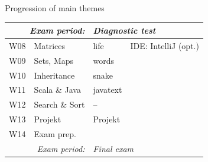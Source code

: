 \documentclass[aspectratio=169]{beamer}
\newenvironment{Slide}[1]%
  {\begin{frame}[environment=Slide]{#1}}
  {\end{frame}}%
\begin{document}
\begin{Slide}{Progression of main themes}
\begin{minipage}{0.54\textwidth}
\begin{tabular}{|l|l|l|l|}
      \multicolumn{2}{r}{\textit{Exam period:}} & \multicolumn{2}{l}{\textit{Diagnostic test}} \\ \hline
      W08 & Matrices        & life        & IDE: IntelliJ (opt.)\\
      W09 & Sets, Maps      & words       & \\
      W10 & Inheritance     & snake       & \\
      W11 & Scala \& Java   & javatext    & \\
      W12 & Search \& Sort  & --          & \\
      W13 & Projekt         & Projekt     & \\
      W14 & Exam prep.      &             & \\ \hline
      \multicolumn{2}{r}{\textit{Exam period:}} & \multicolumn{2}{l}{\textit{Final exam}} \\ \hline
      \end{tabular}  


\end{minipage}
\end{Slide}
\end{document}

